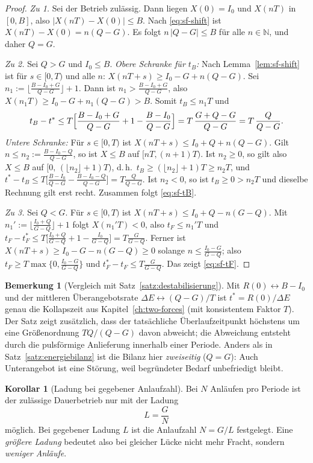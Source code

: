 \documentclass[a4paper, 12pt, twoside, openright]{report}
\theoremstyle{definition}
\theoremstyle{definition}
\newtheorem{bemerkung}{Bemerkung}[chapter]
\newtheorem{korollar}{Korollar}[chapter]
\newcommand{\N}{\mathbb{N}}
\begin{document}
\begin{proof}
\emph{Zu 1.} Sei der Betrieb zulässig. Dann liegen $X(0)=I_0$ und $X(nT)$ in $[0,B]$,
also $|X(nT)-X(0)|\le B$. Nach \eqref{eq:sf-shift} ist $X(nT)-X(0)=n(Q-G)$. Es folgt
$n\,|Q-G|\le B$ für alle $n\in\N$, und daher $Q=G$.

\emph{Zu 2.} Sei $Q>G$ und $I_0\le B$.
\emph{Obere Schranke für $t_B$:} Nach Lemma~\ref{lem:sf-shift} ist für $s\in[0,T)$
und alle $n$: $X(nT+s)\ge I_0-G+n(Q-G)$. Sei
$n_1:=\bigl\lfloor\frac{B-I_0+G}{Q-G}\bigr\rfloor+1$. Dann ist
$n_1>\frac{B-I_0+G}{Q-G}$, also $X(n_1T)\ge I_0-G+n_1(Q-G)>B$. Somit $t_B\le n_1T$ und
\[
  t_B-t^*\le T\Bigl[\frac{B-I_0+G}{Q-G}+1-\frac{B-I_0}{Q-G}\Bigr]
  =T\,\frac{G+Q-G}{Q-G}=T\,\frac{Q}{Q-G}.
\]
\emph{Untere Schranke:} Für $s\in[0,T)$ ist $X(nT+s)\le I_0+Q+n(Q-G)$. Gilt
$n\le n_2:=\frac{B-I_0-Q}{Q-G}$, so ist $X\le B$ auf $[nT,(n+1)T)$. Ist $n_2\ge0$, so
gilt also $X\le B$ auf $[0,\,(\lfloor n_2\rfloor+1)T)$, d.\,h.\
$t_B\ge(\lfloor n_2\rfloor+1)T\ge n_2T$, und
$t^*-t_B\le T\bigl[\frac{B-I_0}{Q-G}-\frac{B-I_0-Q}{Q-G}\bigr]=T\frac{Q}{Q-G}$.
Ist $n_2<0$, so ist $t_B\ge0>n_2T$ und dieselbe Rechnung gilt erst recht.
Zusammen folgt \eqref{eq:sf-tB}.

\emph{Zu 3.} Sei $Q<G$. Für $s\in[0,T)$ ist $X(nT+s)\le I_0+Q-n(G-Q)$. Mit
$n_1':=\lfloor\frac{I_0+Q}{G-Q}\rfloor+1$ folgt $X(n_1'T)<0$, also $t_F\le n_1'T$ und
$t_F-t^*_F\le T\bigl[\frac{I_0+Q}{G-Q}+1-\frac{I_0}{G-Q}\bigr]=T\frac{G}{G-Q}$.
Ferner ist $X(nT+s)\ge I_0-G-n(G-Q)\ge0$ solange $n\le\frac{I_0-G}{G-Q}$; also
$t_F\ge T\max\{0,\frac{I_0-G}{G-Q}\}$ und
$t^*_F-t_F\le T\frac{G}{G-Q}$. Das zeigt \eqref{eq:sf-tF}.
\end{proof}

\begin{bemerkung}[Vergleich mit Satz~\ref{satz:destabilisierung}]
Mit $R(0)\leftrightarrow B-I_0$ und der mittleren Überangebotsrate
$\Delta E\leftrightarrow (Q-G)/T$ ist $t^*=R(0)/\Delta E$ genau die Kollapszeit aus
Kapitel~\ref{ch:two-forces} (mit konsistentem Faktor $T$). Der Satz zeigt zusätzlich,
dass der tatsächliche Überlaufzeitpunkt höchstens um eine Größenordnung
$TQ/(Q-G)$ davon abweicht; die Abweichung entsteht durch die pulsförmige Anlieferung
innerhalb einer Periode.
Anders als in Satz~\ref{satz:energiebilanz} ist die Bilanz hier \emph{zweiseitig}
($Q=G$): Auch Unterangebot ist eine Störung, weil begründeter Bedarf unbefriedigt
bleibt.
\end{bemerkung}

\begin{korollar}[Ladung bei gegebener Anlaufzahl]\label{kor:sf-L}
Bei $N$ Anläufen pro Periode ist der zulässige Dauerbetrieb nur mit der Ladung
\begin{equation}
  L=\frac{G}{N}
  \label{eq:sf-LGN}
\end{equation}
möglich. Bei gegebener Ladung $L$ ist die Anlaufzahl $N=G/L$ festgelegt. Eine
\emph{größere Ladung} bedeutet also bei gleicher Lücke nicht mehr Fracht, sondern
\emph{weniger Anläufe}.
\end{korollar}
\end{document}
